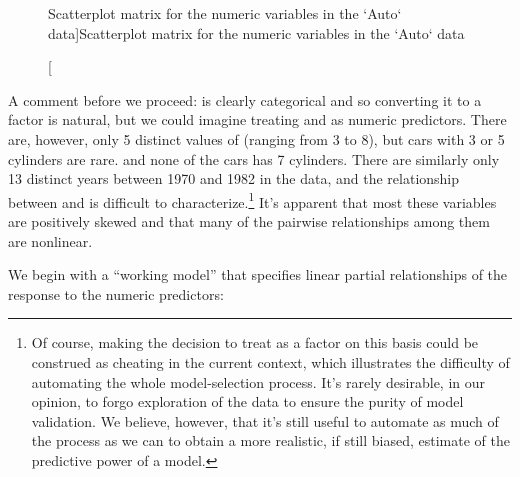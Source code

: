 \documentclass[
]{jss}
\begin{document}
\begin{CodeChunk}
\begin{figure}
{}

\caption[Scatterplot matrix for the numeric variables in the `Auto` data]{Scatterplot matrix for the numeric variables in the `Auto` data}\label{fig:Auto-explore}
\end{figure}
\end{CodeChunk}

A comment before we proceed:  is clearly categorical and so
converting it to a factor is natural, but we could imagine treating
 and  as numeric predictors. There are,
however, only 5 distinct values of  (ranging from 3 to
8), but cars with 3 or 5 cylinders are rare. and none of the cars has 7
cylinders. There are similarly only 13 distinct years between 1970 and
1982 in the data, and the relationship between  and
 is difficult to characterize.\footnote{Of course, making the
  decision to treat  as a factor on this basis could be
  construed as cheating in the current context, which illustrates the
  difficulty of automating the whole model-selection process. It's
  rarely desirable, in our opinion, to forgo exploration of the data to
  ensure the purity of model validation. We believe, however, that it's
  still useful to automate as much of the process as we can to obtain a
  more realistic, if still biased, estimate of the predictive power of a
  model.} It's apparent that most these variables are positively skewed
and that many of the pairwise relationships among them are nonlinear.

We begin with a ``working model'' that specifies linear partial
relationships of the response to the numeric predictors:
\end{document}
